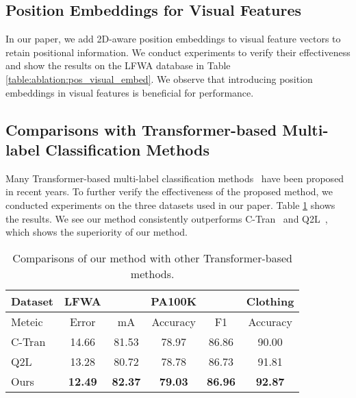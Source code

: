\documentclass[runningheads]{llncs}
\begin{document}
\subsection{Position Embeddings for Visual Features}
In our paper, we add 2D-aware position embeddings to visual feature vectors to retain positional information. We conduct experiments to verify their effectiveness and show the results on the LFWA database in Table \ref{table:ablation:pos_visual_embed}. We observe that introducing position embeddings in visual features is beneficial for performance.

\subsection{Comparisons with Transformer-based Multi-label Classification Methods}
Many Transformer-based multi-label classification methods~\cite{lanchantin2021general,liu2021query2label} have been proposed in recent years. To further verify the effectiveness of the proposed method, we conducted experiments on the three datasets used in our paper. Table \ref{table:comparison1} shows the results. We see our method consistently outperforms C-Tran~\cite{lanchantin2021general} and Q2L~\cite{liu2021query2label}, which shows the superiority of our method.

\begin{table}[t]
\caption{Comparisons of our method with other Transformer-based methods. }
\begin{center}
\renewcommand\tabcolsep{10pt}
\begin{tabular}{l|c|c|c|c|c}
\hline\hline
Dataset  & LFWA  &\multicolumn{3}{c|}{PA100K} & Clothing\\
\hline
Meteic & Error & mA & Accuracy & F1 & Accuracy\\
\hline 
C-Tran \cite{lanchantin2021general} & 14.66 &  81.53 & 78.97  &  86.86 &  90.00  \\
Q2L \cite{liu2021query2label} & 13.28 &  80.72  &  78.78 &  86.73 &  91.81 \\
\hline
Ours & \textbf{12.49} & \textbf{82.37} &  \textbf{79.03} & \textbf{86.96} &  \textbf{92.87} \\
\hline\hline
\end{tabular}
\end{center}
\label{table:comparison1}
\end{table}
\end{document}

